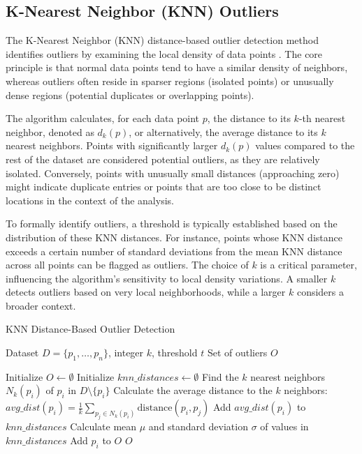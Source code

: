 \subsection{K-Nearest Neighbor (KNN) Outliers}
\label{subsec:KNNDistanceOutlier}

The K-Nearest Neighbor (KNN) distance-based outlier detection method identifies outliers by examining the local density of data points \cite{knn_outlier}. The core principle is that normal data points tend to have a similar density of neighbors, whereas outliers often reside in sparser regions (isolated points) or unusually dense regions (potential duplicates or overlapping points).

The algorithm calculates, for each data point $p$, the distance to its $k$-th nearest neighbor, denoted as $d_k(p)$, or alternatively, the average distance to its $k$ nearest neighbors. Points with significantly larger $d_k(p)$ values compared to the rest of the dataset are considered potential outliers, as they are relatively isolated. Conversely, points with unusually small distances (approaching zero) might indicate duplicate entries or points that are too close to be distinct locations in the context of the analysis.

To formally identify outliers, a threshold is typically established based on the distribution of these KNN distances. For instance, points whose KNN distance exceeds a certain number of standard deviations from the mean KNN distance across all points can be flagged as outliers. The choice of $k$ is a critical parameter, influencing the algorithm's sensitivity to local density variations. A smaller $k$ detects outliers based on very local neighborhoods, while a larger $k$ considers a broader context.

\begin{algorithm}[H]
\caption{KNN Distance-Based Outlier Detection}
\label{alg:knn_outlier}
\begin{algorithmic}[1]
\Require Dataset $D = \{p_1, \dots, p_n\}$, integer $k$, threshold $t$
\Ensure Set of outliers $O$

\State Initialize $O \gets \emptyset$
\State Initialize $knn\_distances \gets \emptyset$
    \State Find the $k$ nearest neighbors $N_k(p_i)$ of $p_i$ in $D \setminus \{p_i\}$
    \State Calculate the average distance to the $k$ neighbors: $avg\_dist(p_i) = \frac{1}{k} \sum_{p_j \in N_k(p_i)} \text{distance}(p_i, p_j)$
    \State Add $avg\_dist(p_i)$ to $knn\_distances$
\EndFor
\State Calculate mean $\mu$ and standard deviation $\sigma$ of values in $knn\_distances$
        \State Add $p_i$ to $O$
    \EndIf
\EndFor
\State \Return $O$
\end{algorithmic}
\end{algorithm}
